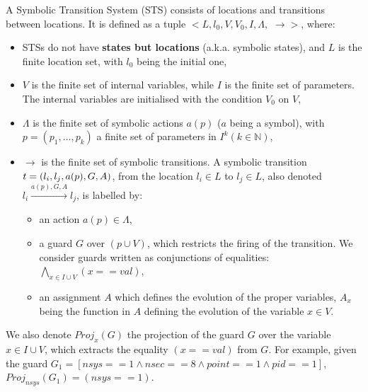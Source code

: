 \begin{definition}
	A Symbolic Transition System (STS) consists of locations and
    transitions between locations. It is defined as a tuple $<
    L,l_0,V,V_0,I,\Lambda,$ $\rightarrow>$, where:

	\begin{itemize}
        \item STSs do not have \textbf{states but locations}
        (a.k.a. symbolic states), and $L$ is the finite location
        set, with $l_0$ being the initial one,

        \item $V$ is the finite set of internal variables, while
        $I$ is the finite set of parameters. The internal
        variables are initialised with the condition $V_0$ on
        $V$,

        \item $\Lambda$ is the finite set of symbolic actions
        $a(p)$ ($a$ being a symbol), with $p=(p_1,\dots ,p_k)$ a
        finite set of parameters in $I^{k} (k \in \mathbb{N})$,

        \item $\rightarrow$ is the
        finite set of symbolic transitions. A symbolic transition
        $t = (l_i,l_j,a(p),G,\\A)$,
        from the location $l_i \in L$ to $l_j \in L$, also
        denoted $l_i \xrightarrow{a(p),G,A} l_j$, is labelled by:

		\begin{itemize}
            \item an action $a(p) \in \Lambda$,

            \item a guard $G$ over $(p \cup V)$, which
            restricts the firing of the transition. We consider
            guards written as conjunctions of equalities:
            $\displaystyle \bigwedge_{x \in I \cup V} (x == val)$,

            \item an assignment $A$ which defines the evolution
            of the proper variables, $A_x$ being the function in
            $A$ defining the evolution of the variable $x \in V$.
		\end{itemize}
	\end{itemize}

	\label{def:sts}
\end{definition}

We also denote $Proj_{x}(G)$ the projection of the guard $G$ over
the variable $x \in I \cup V$, which extracts the equality
$(x==val)$ from $G$. For example, given the guard $G_1 = [nsys==1
\wedge nsec==8 \wedge point==1 \wedge pid==1]$, $Proj_{nsys}(G_1)
= (nsys==1)$.

